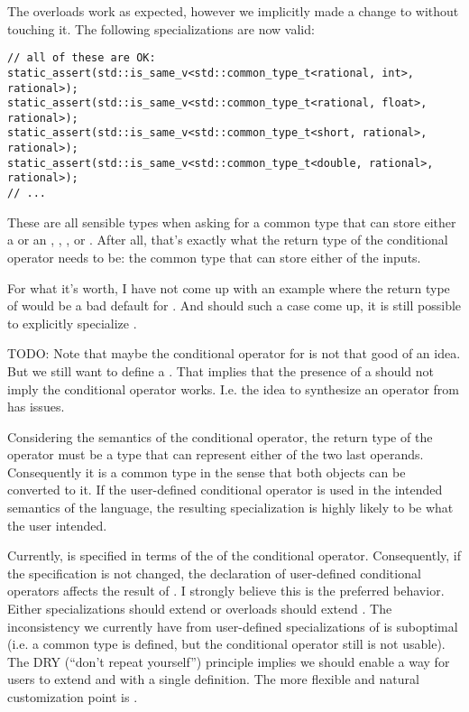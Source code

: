 The overloads work as expected, however we implicitly made a change to  without touching it.
The following  specializations are now valid:
\medskip\begin{lstlisting}[style=Vc]
// all of these are OK:
static_assert(std::is_same_v<std::common_type_t<rational, int>, rational>);
static_assert(std::is_same_v<std::common_type_t<rational, float>, rational>);
static_assert(std::is_same_v<std::common_type_t<short, rational>, rational>);
static_assert(std::is_same_v<std::common_type_t<double, rational>, rational>);
// ...
\end{lstlisting}
These are all sensible types when asking for a common type that can store either a \rational or an \intt, \float, \short, or \double.
After all, that's exactly what the return type of the conditional operator needs to be: the common type that can store either of the inputs.

For what it's worth, I have not come up with an example where the return type of  would be a bad default for .
And should such a case come up, it is still possible to explicitly specialize .

TODO: Note that maybe the conditional operator for \rational is not that good of an idea. But we still want to define a . That implies that the presence of a  should not imply the conditional operator works. I.e. the idea to synthesize an operator from  has issues.

Considering the semantics of the conditional operator, the return type of the operator must be a type that can represent either of the two last operands.
Consequently it is a common type in the sense that both objects can be converted to it.
If the user-defined conditional operator is used in the intended semantics of the language, the resulting  specialization is highly likely to be what the user intended.

Currently,  is specified in terms of the  of the conditional operator.
Consequently, if the  specification is not changed, the declaration of user-defined conditional operators affects the result of .
I strongly believe this is the preferred behavior.
Either  specializations should extend  or  overloads should extend .
The inconsistency we currently have from user-defined specializations of  is suboptimal (i.e. a common type is defined, but the conditional operator still is not usable).
The DRY (“don't repeat yourself”) principle implies we should enable a way for users to extend  and  with a single definition.
The more flexible and natural customization point is .



